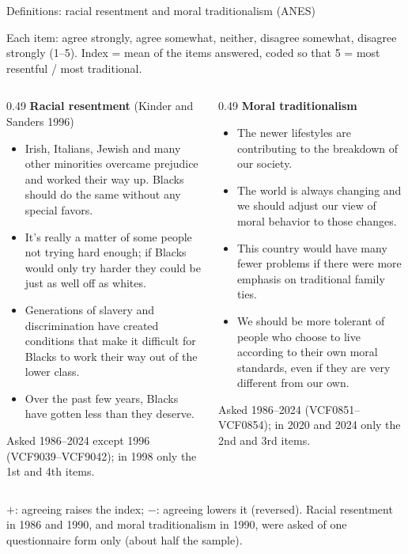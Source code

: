 \documentclass[aspectratio=169]{beamer}
\begin{document}
\begin{frame}{Definitions: racial resentment and moral traditionalism (ANES)}

{\scriptsize
Each item: agree strongly, agree somewhat, neither, disagree somewhat, disagree strongly (1--5). Index = mean of the items answered, coded so that 5 = most resentful / most traditional.

\vspace{0.6em}
\begin{columns}[T]
\begin{column}{0.49\textwidth}
\textbf{Racial resentment} (Kinder and Sanders 1996)
\begin{itemize}\setlength{\itemsep}{2pt}
\item[$+$] Irish, Italians, Jewish and many other minorities overcame prejudice and worked their way up. Blacks should do the same without any special favors.
\item[$+$] It's really a matter of some people not trying hard enough; if Blacks would only try harder they could be just as well off as whites.
\item[$-$] Generations of slavery and discrimination have created conditions that make it difficult for Blacks to work their way out of the lower class.
\item[$-$] Over the past few years, Blacks have gotten less than they deserve.
\end{itemize}
\vspace{0.2em}
{\tiny Asked 1986--2024 except 1996 (VCF9039--VCF9042); in 1998 only the 1st and 4th items.\par}
\end{column}
\begin{column}{0.49\textwidth}
\textbf{Moral traditionalism}
\begin{itemize}\setlength{\itemsep}{2pt}
\item[$+$] The newer lifestyles are contributing to the breakdown of our society.
\item[$-$] The world is always changing and we should adjust our view of moral behavior to those changes.
\item[$+$] This country would have many fewer problems if there were more emphasis on traditional family ties.
\item[$-$] We should be more tolerant of people who choose to live according to their own moral standards, even if they are very different from our own.
\end{itemize}
\vspace{0.2em}
{\tiny Asked 1986--2024 (VCF0851--VCF0854); in 2020 and 2024 only the 2nd and 3rd items.\par}
\end{column}
\end{columns}

\vspace{0.6em}
{\tiny $+$: agreeing raises the index; $-$: agreeing lowers it (reversed). Racial resentment in 1986 and 1990, and moral traditionalism in 1990, were asked of one questionnaire form only (about half the sample).\par}
}

\end{frame}
\end{document}

